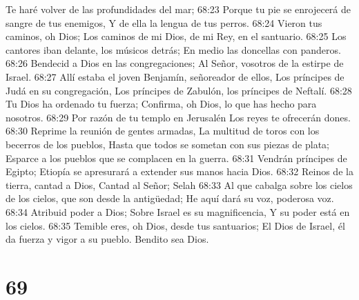 Te haré volver de las profundidades del mar; 
68:23 Porque tu pie se enrojecerá de sangre de tus enemigos, 
Y de ella la lengua de tus perros. 
68:24 Vieron tus caminos, oh Dios; 
Los caminos de mi Dios, de mi Rey, en el santuario. 
68:25 Los cantores iban delante, los músicos detrás; 
En medio las doncellas con panderos. 
68:26 Bendecid a Dios en las congregaciones; 
Al Señor, vosotros de la estirpe de Israel. 
68:27 Allí estaba el joven Benjamín, señoreador de ellos, 
Los príncipes de Judá en su congregación, 
Los príncipes de Zabulón, los príncipes de Neftalí. 
68:28 Tu Dios ha ordenado tu fuerza; 
Confirma, oh Dios, lo que has hecho para nosotros. 
68:29 Por razón de tu templo en Jerusalén 
Los reyes te ofrecerán dones. 
68:30 Reprime la reunión de gentes armadas, 
La multitud de toros con los becerros de los pueblos, 
Hasta que todos se sometan con sus piezas de plata; 
Esparce a los pueblos que se complacen en la guerra. 
68:31 Vendrán príncipes de Egipto; 
Etiopía se apresurará a extender sus manos hacia Dios. 
68:32 Reinos de la tierra, cantad a Dios, 
Cantad al Señor; Selah 
68:33 Al que cabalga sobre los cielos de los cielos, que son desde la antigüedad; 
He aquí dará su voz, poderosa voz. 
68:34 Atribuid poder a Dios; 
Sobre Israel es su magnificencia, 
Y su poder está en los cielos. 
68:35 Temible eres, oh Dios, desde tus santuarios; 
El Dios de Israel, él da fuerza y vigor a su pueblo. 
Bendito sea Dios. 

\chapter{69}

